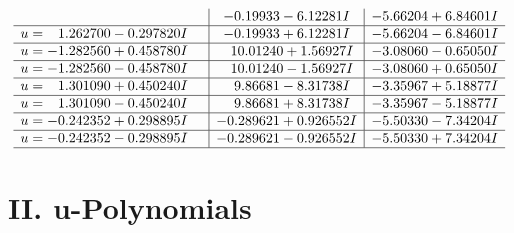 \documentclass[1p]{elsarticle_modified}
\theoremstyle{definition}
\begin{document}
$$\begin{array}{c|c|c}
 & -0.19933 - 6.12281 I & -5.66204 + 6.84601 I \\ \hline\begin{aligned}
u &= \phantom{-}1.262700 - 0.297820 I\end{aligned}
 & -0.19933 + 6.12281 I & -5.66204 - 6.84601 I \\ \hline\begin{aligned}
u &= -1.282560 + 0.458780 I\end{aligned}
 & \phantom{-}10.01240 + 1.56927 I & -3.08060 - 0.65050 I \\ \hline\begin{aligned}
u &= -1.282560 - 0.458780 I\end{aligned}
 & \phantom{-}10.01240 - 1.56927 I & -3.08060 + 0.65050 I \\ \hline\begin{aligned}
u &= \phantom{-}1.301090 + 0.450240 I\end{aligned}
 & \phantom{-}9.86681 - 8.31738 I & -3.35967 + 5.18877 I \\ \hline\begin{aligned}
u &= \phantom{-}1.301090 - 0.450240 I\end{aligned}
 & \phantom{-}9.86681 + 8.31738 I & -3.35967 - 5.18877 I \\ \hline\begin{aligned}
u &= -0.242352 + 0.298895 I\end{aligned}
 & -0.289621 + 0.926552 I & -5.50330 - 7.34204 I \\ \hline\begin{aligned}
u &= -0.242352 - 0.298895 I\end{aligned}
 & -0.289621 - 0.926552 I & -5.50330 + 7.34204 I\\
 \hline 
 \end{array}$$\newpage
\newpage\renewcommand{\arraystretch}{1}
\centering \section*{ II. u-Polynomials}
\end{document}

